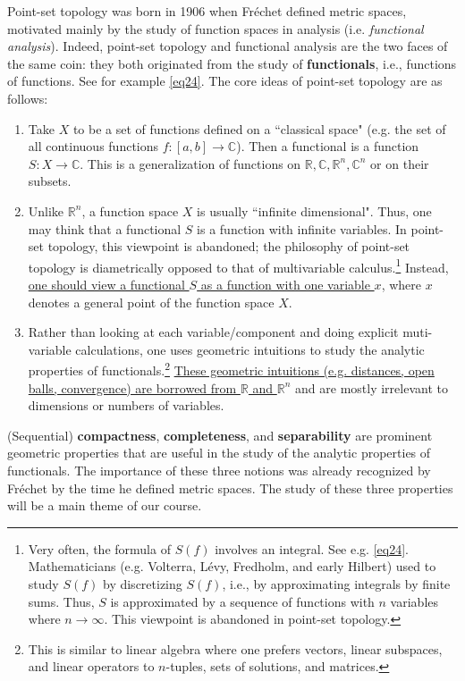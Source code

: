 \documentclass[12pt,b5paper,notitlepage]{article}
\theoremstyle{definition}
\theoremstyle{plain}
\newcommand{\Cbb}{\mathbb C}
\newcommand{\Rbb}{\mathbb R}
\numberwithin{equation}{section}
\begin{document}
Point-set topology was born in 1906 when Fr\'echet defined metric spaces, motivated mainly by the study of function spaces in analysis (i.e. \emph{functional analysis}). Indeed, point-set topology and functional analysis are the two faces of the same coin: they both originated from the study of \textbf{functionals},  i.e., functions of functions. See for example \eqref{eq24}. The core ideas of point-set topology are as follows:
\begin{enumerate}[label=(\arabic*)]
\item Take $X$ to be a set of functions defined on a ``classical space" (e.g. the set of all continuous functions $f:[a,b]\rightarrow\Cbb$). Then a functional is a function  $S:X\rightarrow \Cbb$. This is a generalization of functions on $\Rbb,\Cbb,\Rbb^n,\Cbb^n$ or on their subsets.
\item Unlike $\Rbb^n$, a function space $X$ is usually ``infinite dimensional". Thus, one may think that a functional $S$ is a function with infinite variables. In point-set topology, this viewpoint is abandoned; the philosophy of point-set topology is diametrically opposed to that of multivariable calculus.\footnote{Very often, the formula of $S(f)$ involves an integral. See e.g. \eqref{eq24}. Mathematicians (e.g. Volterra, L\'evy, Fredholm, and early Hilbert) used to study $S(f)$ by discretizing $S(f)$, i.e., by approximating integrals by finite sums. Thus, $S$ is approximated by a sequence of functions with $n$ variables where $n\rightarrow\infty$. This viewpoint is abandoned in point-set topology.} Instead, \ul{one should view a functional $S$ as a function with one variable $x$}, where $x$ denotes a general point of the function space $X$.
\item Rather than looking at each variable/component and doing explicit muti-variable calculations, one uses geometric intuitions to study the analytic properties of functionals.\footnote{This is similar to linear algebra where one prefers vectors, linear subspaces, and linear operators to $n$-tuples, sets of solutions, and matrices.} \ul{These geometric intuitions (e.g. distances, open balls, convergence) are borrowed from  $\Rbb$ and $\Rbb^n$}  and are mostly irrelevant to dimensions or numbers of variables.
\end{enumerate}



(Sequential) \textbf{compactness}, \textbf{completeness}, and \textbf{separability} are prominent geometric properties that are useful in the study of the analytic properties of functionals. The importance of these three notions  was  already recognized by Fr\'echet by the time he defined metric spaces. The study of these three properties will be a main theme of our course.
\end{document}
